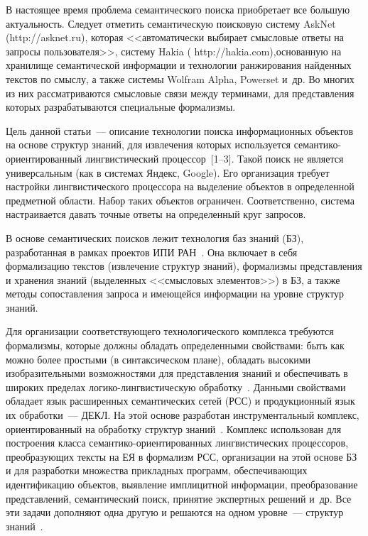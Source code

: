 \begin{multicols}{2}
    В настоящее время проблема семантического поиска приобретает все 
большую актуальность. Следует отметить семантическую поисковую сис\-тему 
{AskNet} ({\sf http://asknet.ru}), которая <<автоматически выбирает 
смысловые ответы на запросы пользователя>>, систему {Hakia} ({\sf 
http://hakia.com}),\linebreak основанную на хранилище семантической информации и 
технологии ранжирования найденных текстов по смыслу, а также системы 
Wolfram Alpha, Powerset и~др. Во многих из них 
рассматриваются смыс\-ло\-вые связи между терминами, для представления 
которых разрабатываются специальные фор\-ма\-лизмы.
    
    Цель данной статьи~--- описание технологии поиска информационных 
объектов на основе структур знаний, для извлечения которых используется 
семантико-ориентированный лингвистический процессор~[1--3]. 
Такой поиск не является универсальным (как в системах Яндекс, 
Google). Его организация требует настройки лингвистического 
процессора на выделение объектов в определенной предметной области. Набор 
таких объектов ограничен. Соответственно, система настраивается давать 
точные ответы на определенный круг запросов.
    
    В основе семантических поисков лежит технология баз знаний (БЗ), 
разработанная в рамках проектов ИПИ РАН~\cite{3sha}. Она включает в себя 
формализацию текстов (извлечение структур знаний), формализмы 
представления и хранения знаний (выделенных <<смысловых элементов>>) в 
БЗ, а также методы сопоставления запроса и имеющейся информации на уровне 
структур знаний.
    
    Для организации соответствующего технологического комплекса 
требуются формализмы, которые должны обладать определенными свойствами: 
быть как можно более простыми (в синтаксическом плане), обладать высокими 
изобразительными возможностями для представления знаний и обеспечивать в 
широких пределах логико-лингвистическую обработку~\cite{1sha}. Данными 
свойствами обладает язык расширенных семантических сетей (РСС) и 
продукционный язык их обработки~--- ДЕКЛ. На этой основе разработан 
инструментальный комплекс, ориентированный на обработку структур 
знаний~\cite{2sha, 8sha}. Комплекс использован для построения класса 
семантико-ориентированных лингвистических процессоров, преобразующих 
тексты на ЕЯ в формализм РСС, организации на этой основе БЗ и для 
разработки множества прикладных программ, обеспечивающих 
идентификацию объектов, выявление имплицитной информации, 
преобразование представлений, семантический поиск, принятие экспертных 
решений и~др. Все эти задачи дополняют одна другую и решаются на одном 
уровне~--- структур знаний~\cite{3sha}.
    

\end{multicols}
